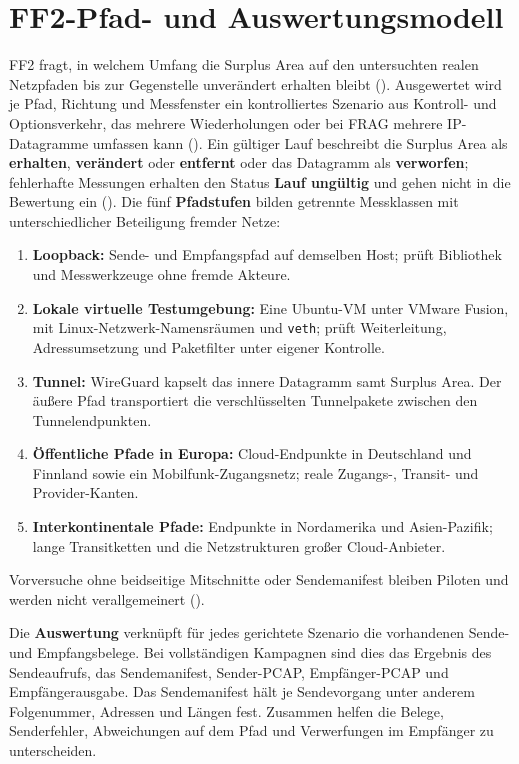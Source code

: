\section{FF2-Pfad- und Auswertungsmodell}
\label{sec:ff2-pfadmodell}

FF2 fragt, in welchem Umfang die Surplus Area auf den untersuchten realen Netzpfaden bis zur Gegenstelle
unverändert erhalten bleibt
(). Ausgewertet wird je Pfad, Richtung und Messfenster ein kontrolliertes
Szenario aus Kontroll- und Optionsverkehr, das mehrere Wiederholungen oder bei FRAG mehrere
IP-Datagramme umfassen kann (). Ein gültiger Lauf beschreibt die Surplus
Area als \textbf{erhalten}, \textbf{verändert} oder \textbf{entfernt} oder das Datagramm als
\textbf{verworfen}; fehlerhafte Messungen
erhalten den Status \textbf{Lauf ungültig} und gehen nicht in die Bewertung ein
(). Die fünf \textbf{Pfadstufen} bilden getrennte Messklassen mit
unterschiedlicher Beteiligung fremder Netze:

\begin{enumerate}
  \item \textbf{Loopback:} Sende- und Empfangspfad auf demselben Host; prüft Bibliothek und Messwerkzeuge
    ohne fremde Akteure.
  \item \textbf{Lokale virtuelle Testumgebung:} Eine Ubuntu-VM unter VMware Fusion,
    mit Linux-Netzwerk-Namensräumen und \texttt{veth}; prüft Weiterleitung, Adress\-umsetzung und
    Paketfilter unter eigener Kontrolle.
  \item \textbf{Tunnel:} WireGuard kapselt das innere Datagramm samt Surplus Area. Der äußere Pfad
    transportiert die verschlüsselten Tunnelpakete zwischen den Tunnel\-endpunkten.
  \item \textbf{Öffentliche Pfade in Europa:} Cloud-Endpunkte in Deutschland und Finnland sowie ein
    Mobilfunk-Zugangsnetz; reale Zugangs-, Transit- und Provider-Kanten.
  \item \textbf{Interkontinentale Pfade:} Endpunkte in Nordamerika und Asien-Pazifik; lange Transitketten
    und die Netzstrukturen großer Cloud-Anbieter.
\end{enumerate}

Vorversuche ohne beidseitige Mitschnitte oder Sendemanifest bleiben Piloten und werden nicht
verallgemeinert ().

Die \textbf{Auswertung} verknüpft für jedes gerichtete Szenario die vorhandenen Sende- und Empfangsbelege.
Bei vollständigen Kampagnen sind dies das Ergebnis des Sendeaufrufs, das Sendemanifest, Sender-PCAP,
Empfänger-PCAP und Empfänger\-ausgabe. Das Sendemanifest hält je Sendevorgang unter anderem Folgenummer,
Adressen und Längen fest. Zusammen helfen die Belege, Senderfehler, Abweichungen auf dem Pfad und
Verwerfungen im Empfänger zu unterscheiden.

